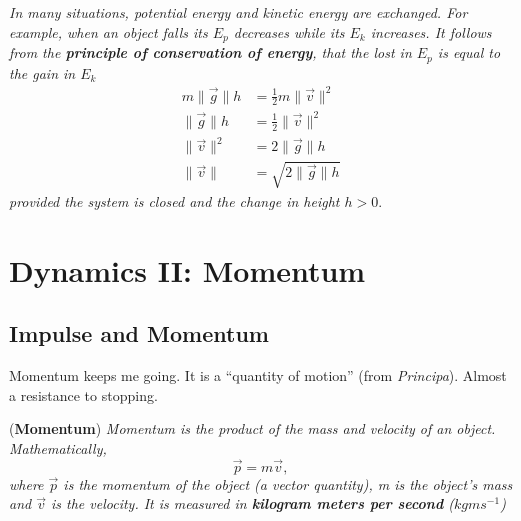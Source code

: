 \begin{corollary}
\textit{In many situations, potential energy and kinetic energy are exchanged. For example, when an object falls its $E_p$ decreases while its $E_k$ increases. It follows from the \textbf{principle of conservation of energy}, that the lost in $E_p$ is equal to the gain in $E_k$}
\begin{align*}
    m\| \vec{g} \|h &= \frac{1}{2}m\| \vec{v} \|^2 \\
    \| \vec{g} \|h &= \frac{1}{2} \| \vec{v} \|^2 \\
    \| \vec{v} \|^2 &= 2\| \vec{g} \|h \\
    \| \vec{v} \| &= \sqrt{2\| \vec{g} \|h}
\end{align*}
\textit{provided the system is closed and the change in height $h > 0$}.
\end{corollary}

\section{Dynamics II: Momentum}

\subsection{Impulse and Momentum}
\label{subsection:impulse-and-momentum}

Momentum keeps me going. It is a ``quantity of motion'' (from \textit{Principa}). Almost a resistance to stopping. 

\begin{definition}{(\textbf{Momentum})}
\textit{Momentum is the product of the mass and velocity of an object. Mathematically, }
\begin{equation}
    \vec{p} = m \vec{v},
\end{equation}
\textit{where $\vec{p}$ is the momentum of the object (a vector quantity), m is the object's mass and $\vec{v}$ is the velocity. It is measured in \textbf{kilogram meters per second} ($kgms^{-1}$)}
\end{definition}

